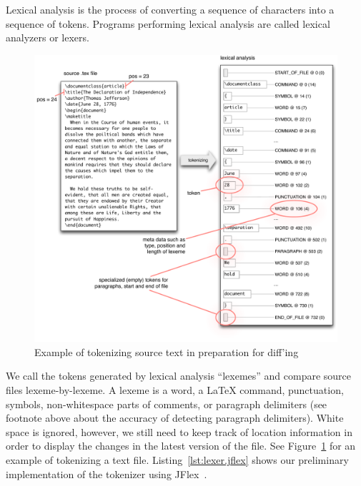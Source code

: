 Lexical analysis is the process of converting a sequence of characters into a sequence of tokens. Programs performing lexical analysis are called lexical analyzers or lexers.  

\begin{figure} 
\centering
\includegraphics[width=\textwidth]{./figures/tokenizer-example}
\caption{Example of tokenizing source text in preparation for diff'ing} \label{fig:tokenizer-example}
\end{figure}



We call the tokens generated by lexical analysis ``lexemes'' and compare source files lexeme-by-lexeme.  A lexeme is a word, a LaTeX command, punctuation, symbols, non-whitespace parts of comments, or paragraph delimiters (see footnote above about the accuracy of detecting paragraph delimiters).  White space is ignored, however, we still need to keep track of location information in order to display the changes in the latest version of the file.  See Figure~\ref{fig:tokenizer-example} for an example of tokenizing a text file.  Listing~\ref{lst:lexer.jflex} shows our preliminary implementation of the tokenizer using JFlex~\cite{jflex}.

